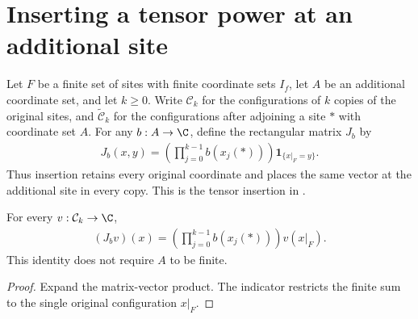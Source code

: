 \section{Inserting a tensor power at an additional site}

\begin{definition}
    \label{def:added_site_tensor_insertion}
    \leanok
    Let $F$ be a finite set of sites with finite coordinate sets $I_f$,
    let $A$ be an additional coordinate set, and let $k\geq0$.
    Write $\mathcal C_k$ for the configurations of $k$ copies of the
    original sites, and $\widetilde{\mathcal C}_k$ for the configurations
    after adjoining a site $*$ with coordinate set $A$.
    For any $b:A\to\C$, define the rectangular matrix $J_b$ by
    \begin{align*}
        J_b(x,y)=\left(\prod_{j=0}^{k-1}b(x_j(*))\right)
        \mathbf 1_{\{x|_F=y\}}.
    \end{align*}
    Thus insertion retains every original coordinate and places the
    same vector at the additional site in every copy. This is the
    tensor insertion in \cite[Section~8, lines~283--308]{OpenAI2026AreaLaw}.
\end{definition}

\begin{theorem}
    \label{thm:added_site_tensor_insertion_action}
    \leanok
    For every $v:\mathcal C_k\to\C$,
    \begin{align*}
        (J_bv)(x)=\left(\prod_{j=0}^{k-1}b(x_j(*))\right)v(x|_F).
    \end{align*}
    This identity does not require $A$ to be finite.
\end{theorem}
\begin{proof}
    \leanok
    Expand the matrix-vector product. The indicator restricts the
    finite sum to the single original configuration $x|_F$.
\end{proof}

